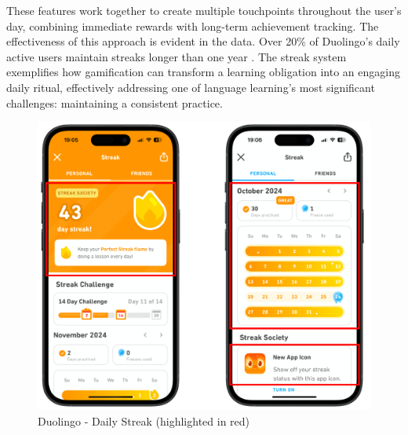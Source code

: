 \begin{itemize}
    These features work together to create multiple touchpoints throughout the user's day, combining immediate rewards with long-term achievement tracking. The effectiveness of this approach is evident in the data. Over 20\% of Duolingo's daily active users maintain streaks longer than one year \cite{cite:duolingo_2024q2}. The streak system exemplifies how gamification can transform a learning obligation into an engaging daily ritual, effectively addressing one of language learning's most significant challenges: maintaining a consistent practice.
    
    \begin{figure}[!h]
        \includegraphics[width=1\textwidth]{chapters/images/duolingo-streak.png}
        \caption{Duolingo - Daily Streak (highlighted in red)}
        \label{fig:duolingo-daily-streak}
    \end{figure}
    
\end{itemize}